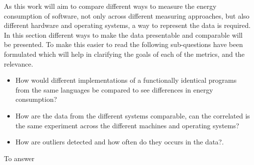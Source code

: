 As this work will aim to compare different ways to measure the energy consumption of software, not only across different measuring approaches, but also different hardware and operating systems, a way to represent the data is required. In this section different ways to make the data presentable and comparable will be presented. To make this easier to read the following sub-questions have been formulated which will help in clarifying the goals of each of the metrics, and the relevance.
\begin{itemize}
    \item How would different implementations of a functionally identical programs from the same languages be compared to see differences in energy consumption?
    \item How are the data from the different systems comparable, can the correlated is the same experiment across the different machines and operating systems?
    \item How are outliers detected and how often do they occurs in the data?.
\end{itemize}
To answer








